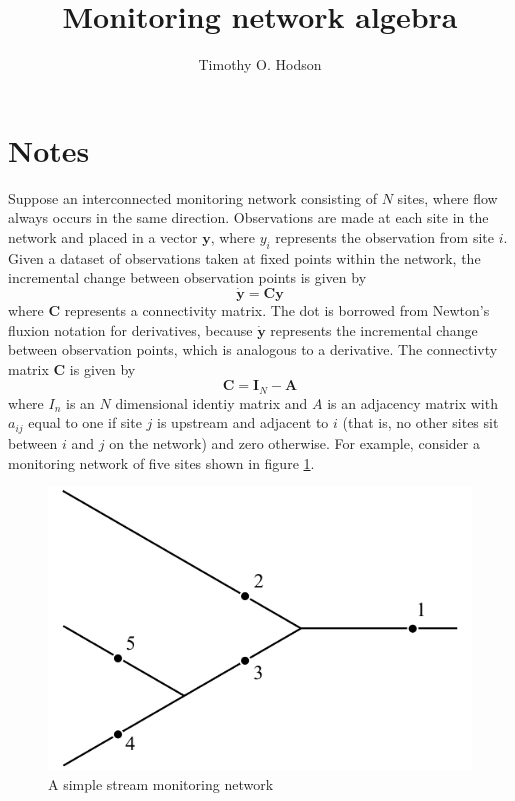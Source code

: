 \documentclass{article}
\title{Monitoring network algebra}
\author[1]{Timothy O. Hodson}
\affil[1]{U.S. Geological Survey Central Midwest Water Science Center}
\date{}
\begin{document}
\maketitle

\section{Notes}
Suppose an interconnected monitoring network consisting of $N$ sites, where flow always occurs in the same direction.
Observations are made at each site in the network and placed in a
vector $\pmb{y}$, where $y_i$ represents the observation from site $i$.
Given a dataset of observations taken at fixed points within the network,
the incremental change between observation points is given by
\begin{equation}
\pmb{\dot y} = \pmb{C} \pmb{y}
\end{equation}
where $\pmb{C}$ represents a connectivity matrix.
The dot is borrowed from Newton's fluxion notation for derivatives,
because $\pmb{\dot y}$ represents the incremental change between observation points, which is analogous to a derivative.
The connectivty matrix $\pmb{C}$ is given by
\begin{equation}
  \pmb{C} = \pmb{I}_N - \pmb{A}
\end{equation}
where $I_n$ is an $N$ dimensional identiy matrix and $A$ is an adjacency matrix with $a_{ij}$ equal to one if site $j$ is upstream and adjacent to $i$ (that is, no other sites sit between $i$ and $j$ on the network) and zero otherwise.
For example, consider a monitoring network of five sites shown in figure \ref{fig:monitoring_network}.
\begin{figure}%
  \centering
  \includegraphics{figures/monitoring_network.pdf}
  \caption{A simple stream monitoring network}
  \label{fig:monitoring_network}
\end{figure}
\end{document}
